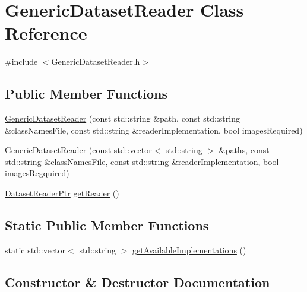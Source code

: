 \hypertarget{class_generic_dataset_reader}{}\section{Generic\+Dataset\+Reader Class Reference}
\label{class_generic_dataset_reader}


{\ttfamily \#include $<$Generic\+Dataset\+Reader.\+h$>$}

\subsection*{Public Member Functions}
\begin{DoxyCompactItemize}
\item 
\hyperlink{class_generic_dataset_reader_a9a7b0030a642e855e5847c8bbbbeb715}{Generic\+Dataset\+Reader} (const std\+::string \&path, const std\+::string \&class\+Names\+File, const std\+::string \&reader\+Implementation, bool images\+Required)
\item 
\hyperlink{class_generic_dataset_reader_a1fc3abcead6cd89fc263817111d6088e}{Generic\+Dataset\+Reader} (const std\+::vector$<$ std\+::string $>$ \&paths, const std\+::string \&class\+Names\+File, const std\+::string \&reader\+Implementation, bool images\+Regquired)
\item 
\hyperlink{_dataset_reader_8h_a30d89cba514a220d64d04535c0465f1c}{Dataset\+Reader\+Ptr} \hyperlink{class_generic_dataset_reader_a94efb90275d8a0bbce75cdfbbea96eae}{get\+Reader} ()
\end{DoxyCompactItemize}
\subsection*{Static Public Member Functions}
\begin{DoxyCompactItemize}
\item 
static std\+::vector$<$ std\+::string $>$ \hyperlink{class_generic_dataset_reader_a61027ae03b1fcf92eee88c95eb8740a0}{get\+Available\+Implementations} ()
\end{DoxyCompactItemize}


\subsection{Constructor \& Destructor Documentation}
\mbox{\label{class_generic_dataset_reader_a9a7b0030a642e855e5847c8bbbbeb715}} 
